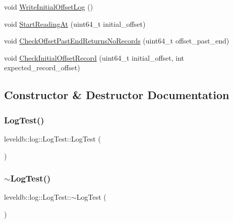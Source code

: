 \begin{DoxyCompactItemize}
\item 
void \mbox{\hyperlink{classleveldb_1_1log_1_1_log_test_af0053e30c5ccaa5e2e10d595a4f48565}{Write\+Initial\+Offset\+Log}} ()
\item 
void \mbox{\hyperlink{classleveldb_1_1log_1_1_log_test_a1fc5492e2eca6cb26b652322ed3cdc31}{Start\+Reading\+At}} (uint64\+\_\+t initial\+\_\+offset)
\item 
void \mbox{\hyperlink{classleveldb_1_1log_1_1_log_test_a2bf9cdf3b3f722c300f65a7752c0e101}{Check\+Offset\+Past\+End\+Returns\+No\+Records}} (uint64\+\_\+t offset\+\_\+past\+\_\+end)
\item 
void \mbox{\hyperlink{classleveldb_1_1log_1_1_log_test_ab9ca8c2014e78611d66d884f7b46e4ff}{Check\+Initial\+Offset\+Record}} (uint64\+\_\+t initial\+\_\+offset, int expected\+\_\+record\+\_\+offset)
\end{DoxyCompactItemize}


\subsection{Constructor \& Destructor Documentation}
\mbox{\label{classleveldb_1_1log_1_1_log_test_a71c5f0a5a098ca82a72e7065141a1d06}} 
\subsubsection{\texorpdfstring{LogTest()}{LogTest()}}
{\footnotesize\ttfamily leveldb\+::log\+::\+Log\+Test\+::\+Log\+Test (\begin{DoxyParamCaption}{ }\end{DoxyParamCaption})\hspace{0.3cm}{\ttfamily [inline]}}

\mbox{\label{classleveldb_1_1log_1_1_log_test_adee9ce15bff328c3230fcc097a704400}} 
\subsubsection{\texorpdfstring{$\sim$LogTest()}{~LogTest()}}
{\footnotesize\ttfamily leveldb\+::log\+::\+Log\+Test\+::$\sim$\+Log\+Test (\begin{DoxyParamCaption}{ }\end{DoxyParamCaption})\hspace{0.3cm}{\ttfamily [inline]}}



